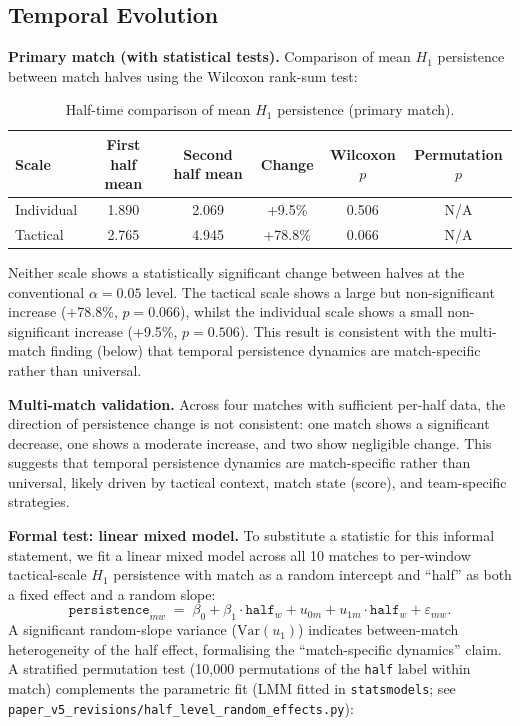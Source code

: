 \subsection{Temporal Evolution}
\label{sec:temporal}

\textbf{Primary match (with statistical tests).} Comparison of mean \(H_1\) persistence between match halves using the Wilcoxon rank-sum test:

\begin{table}[H]
  \centering
  \caption{Half-time comparison of mean \(H_1\) persistence (primary match).}
  \label{tab:temporal}
  \begin{tabular}{@{}lccccc@{}}
      \toprule
      Scale & First half mean & Second half mean & Change & Wilcoxon \(p\) & Permutation \(p\) \\
      \midrule
      Individual & 1.890 & 2.069 & +9.5\%  & 0.506 & N/A \\
      Tactical   & 2.765 & 4.945 & +78.8\% & 0.066 & N/A \\
      \bottomrule
  \end{tabular}
\end{table}

Neither scale shows a statistically significant change between halves at the conventional $\alpha=0.05$ level. The tactical scale shows a large but non-significant increase (+78.8\%, $p=0.066$), whilst the individual scale shows a small non-significant increase (+9.5\%, $p=0.506$). This result is consistent with the multi-match finding (below) that temporal persistence dynamics are match-specific rather than universal.

\textbf{Multi-match validation.} Across four matches with sufficient per-half data, the direction of persistence change is not consistent: one match shows a significant decrease, one shows a moderate increase, and two show negligible change. This suggests that temporal persistence dynamics are match-specific rather than universal, likely driven by tactical context, match state (score), and team-specific strategies.

\textbf{Formal test: linear mixed model.} To substitute a statistic for this informal statement, we fit a linear mixed model across all 10 matches to per-window tactical-scale \(H_1\) persistence with match as a random intercept and ``half'' as both a fixed effect and a random slope:
\[
  \mathtt{persistence}_{mw} \;=\; \beta_0 + \beta_1 \cdot \mathtt{half}_{w} + u_{0m} + u_{1m}\cdot\mathtt{half}_{w} + \varepsilon_{mw}.
\]
A significant random-slope variance (\(\mathrm{Var}(u_1)\)) indicates between-match heterogeneity of the half effect, formalising the ``match-specific dynamics'' claim. A stratified permutation test (10{,}000 permutations of the \texttt{half} label within match) complements the parametric fit (LMM fitted in \texttt{statsmodels}; see \texttt{paper\_v5\_revisions/half\_level\_random\_effects.py}):

